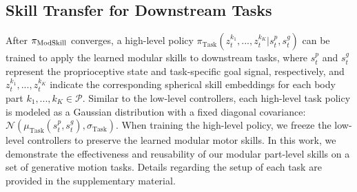 \subsection{Skill Transfer for Downstream Tasks}
\label{sec:transfer}

After $\pi_{\text{ModSkill}}$ converges, a high-level policy $\pi_{\text{Task}}(z_{t}^{k_{1}}, ..., z_{t}^{k_{K}} | s_{t}^{p}, s_{t}^{g})$ can be trained to apply the learned modular skills to downstream tasks, where $s_{t}^{p}$ and $s_{t}^{g}$ represent the proprioceptive state and task-specific goal signal, respectively, and $z_{t}^{k_{1}}, ..., z_{t}^{k_{K}}$ indicate the corresponding spherical skill embeddings for each body part $k_{1}, ..., k_{K} \in \mathcal{P}$. Similar to the low-level controllers, each high-level task policy is modeled as a Gaussian distribution with a fixed diagonal covariance: $\mathcal{N}(\mu_{\text{Task}}(s_{t}^{p}, s_{t}^{g}), \sigma_{\text{Task}})$. When training the high-level policy, we freeze the low-level controllers to preserve the learned modular motor skills. In this work, we demonstrate the effectiveness and reusability of our modular part-level skills on a set of generative motion tasks. Details regarding the setup of each task are provided in the supplementary material.